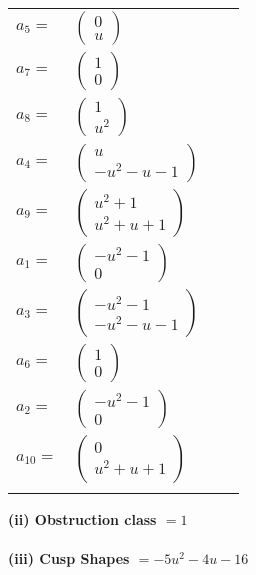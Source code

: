 \documentclass[1p]{elsarticle_modified}
\theoremstyle{definition}
\begin{document}
\begin{tabular}{m{7pt} m{180pt} m{7pt} m{180pt} }
\flushright $a_{5}=$&$\begin{pmatrix}0\\u\end{pmatrix}$ \\
\flushright $a_{7}=$&$\begin{pmatrix}1\\0\end{pmatrix}$ \\
\flushright $a_{8}=$&$\begin{pmatrix}1\\u^2\end{pmatrix}$ \\
\flushright $a_{4}=$&$\begin{pmatrix}u\\- u^2- u-1\end{pmatrix}$ \\
\flushright $a_{9}=$&$\begin{pmatrix}u^2+1\\u^2+u+1\end{pmatrix}$ \\
\flushright $a_{1}=$&$\begin{pmatrix}- u^2-1\\0\end{pmatrix}$ \\
\flushright $a_{3}=$&$\begin{pmatrix}- u^2-1\\- u^2- u-1\end{pmatrix}$ \\
\flushright $a_{6}=$&$\begin{pmatrix}1\\0\end{pmatrix}$ \\
\flushright $a_{2}=$&$\begin{pmatrix}- u^2-1\\0\end{pmatrix}$ \\
\flushright $a_{10}=$&$\begin{pmatrix}0\\u^2+u+1\end{pmatrix}$\\&\end{tabular}
\flushleft \textbf{(ii) Obstruction class $= 1$}\\~\\
\flushleft \textbf{(iii) Cusp Shapes $= -5 u^2-4 u-16$}\\~\\
\end{document}
